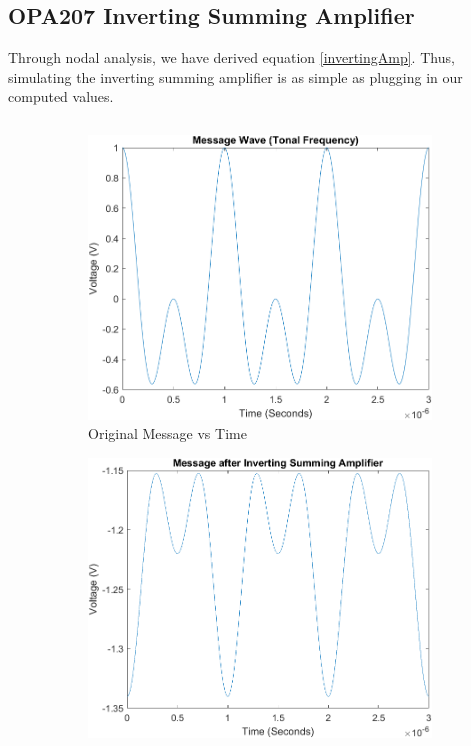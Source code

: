 \subsection{OPA207 Inverting Summing Amplifier}
Through nodal analysis, we have derived equation \eqref{invertingAmp}. Thus, simulating the inverting summing amplifier is as simple as plugging in our computed values.
\inputminted[breaklines]{Matlab}{./Code/OpAmp_Simulation.m}

\begin{figure}[H]
    \centering
    \begin{subfigure}[b]{0.48\textwidth}
        \centering
        \includegraphics[width = 1\textwidth]{Images/MessagevTime.png}
        \caption{Original Message vs Time}
        \label{fig:messageVTime}
     \end{subfigure}
     \hfill
     \begin{subfigure}[b]{0.48\textwidth}
        \centering
        \includegraphics[width = 1\textwidth]{Images/AfterInverting.png}

\end{subfigure}
\end{figure}
